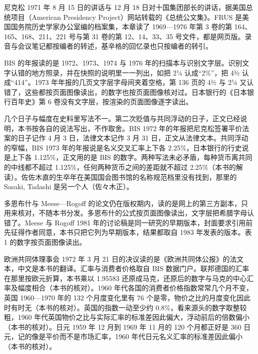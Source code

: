 \begin{deeper}[史料说明]
尼克松 1971 年 8 月 15 日的讲话与 12 月 18 日对十国集团部长的讲话，据美国总统项目（American Presidency Project）网站转载的《总统公文集》。FRUS 是美国国务院历史学家办公室编的档案集，本章读了 1969—1976 年第 3 卷的第 164、165、168、211、221 号与第 31 卷的第 12、14、33、35 号文件，都是网页版。录音与会议笔记都按编者的转述，基辛格的回忆录也只按编者的转引。

BIS 的年报读的是 1972、1973、1974 与 1976 年的扫描本与识别文字层。识别文字认错的地方照录，并在快照的说明里一一列出，如把 2¼ 认成“2\%”，把 4½ 认成“414”。1973 年年报的几页文字层字母间夹着空格，第 136 页的 4½ 与 2¼ 又认错了，这些都按页面图像读出，的数字也按页面图像核对过。日本银行的《日本银行百年史》第 6 卷没有文字层，按渲染的页面图像逐字读出。

几个日子与幅度在史料里写法不一。第二次贬值与共同浮动的日子，正文已经说明，本书按各自的说法写出，不作取舍。BIS 1972 年的年报把尼克松签署平价法案的日子记作 4 月 3 日，法律文本记作 3 月 31 日，正文从法律文本\cite{bis1972,pvma1972}。共同浮动的窄幅，BIS 1973 年的年报说是名义交叉汇率上下各 2.25\%，日本银行的行史说是上下各 1.125\%，正文用的是 BIS 的数字。两种写法未必矛盾，每种货币离共同的中线都不超过 1.125\%，任何两种货币之间的差距就不超过 2.25\%（本书的解读）。佐佐木直的生卒年在美国国会图书馆的名称规范档里没有找到，那里的 Sasaki, Tadashi 是另一个人（佐々木正）。

多恩布什与 Meese—Rogoff 的论文仍在版权期内，读的是网上的第三方副本，只用来核对，不随本书分发。多恩布什的公式按页面图像读出，文字层把希腊字母认错了。Meese 与 Rogoff 1981 年的讨论稿是同一研究的早期版本，封面要求引用前先征得作者同意，本书只把它列为早期版本\cite{meese1981}，结果都取自 1983 年发表的版本。表 1 的数字按页面图像读出。

欧洲共同体理事会 1972 年 3 月 21 日的决议读的是《欧洲共同体公报》的法文本，中文是本书的翻译。汇率与消费者价格取自 BIS 数据门户。联邦德国的汇率在那里按欧元折算，本书乘以 1.95583 还原成马克，还原后的数字与马克的中心汇率及幅度相合（本书的核对）。1960 年代各国的消费者价格指数常常几个月不变，英国 1960—1970 年的 132 个月度变化里有 76 个是零，物价之比的月度变化因此时有时无（本书的核对）。英国的指数一动至少约 0.8\%，看来源头的数字取整较粗，1960 年代英国物价之比与实际汇率的标准差因此偏大，浮动前后的倍数偏小（本书的核对）。日元 1959 年 12 月到 1969 年 11 月的 120 个月都正好是 360 日元，记的像是平价而不是市场汇率，1960 年代日元名义汇率的标准差因此偏小（本书的核对）。
\end{deeper}

